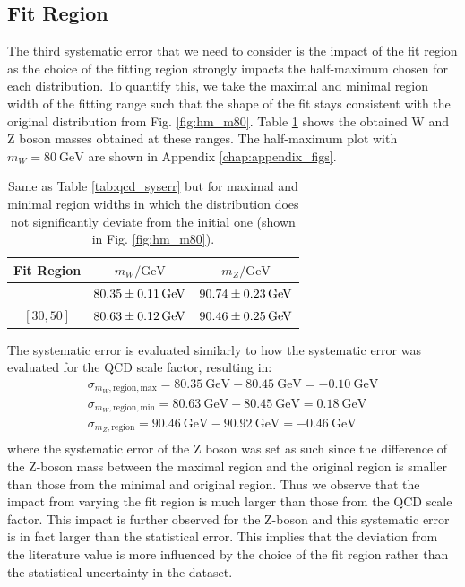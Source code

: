 \documentclass[a4paper]{report}
\numberwithin{equation}{section}
\begin{document}
\subsection{Fit Region}

The third systematic error that we need to consider is the impact of the fit region as the choice of the fitting region 
strongly impacts the half-maximum chosen for each distribution. To quantify this, we take the maximal and minimal 
region width of the fitting range such that the shape of the fit stays consistent with the original distribution from 
Fig. \ref{fig:hm_m80}. Table \ref{tab:fitregion_syserr} shows the obtained W and Z boson masses obtained at these ranges. 
The half-maximum plot with $m_W = \SI{80}{\giga\electronvolt}$ are shown in Appendix \ref{chap:appendix_figs}.

\begin{table}
    \centering
    \begin{tabular}{|c|c|c|} \hline
    Fit Region &  $m_W / \si{\giga\electronvolt}$ & $m_Z / \si{\giga\electronvolt}$\\ \hline
    [26, 65] & $\SI{80.35 \pm 0.11 }{\giga\electronvolt}$ & $\SI{90.74 \pm 0.23}{\giga\electronvolt}$ \\ 
    $\left[30, 50\right]$ & $\SI{80.63 \pm 0.12}{\giga\electronvolt}$ & $\SI{90.46 \pm 0.25}{\giga\electronvolt}$ \\ \hline
    \end{tabular}
    \caption{Same as Table \ref{tab:qcd_syserr} but for maximal and minimal region widths in which the distribution 
    does not significantly deviate from the initial one (shown in Fig. \ref{fig:hm_m80}).}
    \label{tab:fitregion_syserr}
\end{table}

The systematic error is evaluated similarly to how the systematic error was evaluated for the QCD scale factor, resulting in:
\begin{align}
    \sigma_{m_W, \mathrm{region, max}} = \SI{80.35}{\giga\electronvolt} - \SI{80.45}{\giga\electronvolt} = -\SI{0.10}{\giga\electronvolt} \\
    \sigma_{m_W, \mathrm{region, min}} = \SI{80.63}{\giga\electronvolt} - \SI{80.45}{\giga\electronvolt} = \SI{0.18}{\giga\electronvolt} \\
    \sigma_{m_Z, \mathrm{region}} = \SI{90.46}{\giga\electronvolt} - \SI{90.92}{\giga\electronvolt} = -\SI{0.46}{\giga\electronvolt} \\
\end{align}
where the systematic error of the Z boson was set as such since the difference of the Z-boson mass between the maximal
 region and the original region is smaller than those from the minimal and original region. Thus we observe that the impact from 
 varying the fit region is much larger than those from the QCD scale factor. This impact is further observed for the Z-boson and 
 this systematic error is in fact larger than the statistical error. This implies that the deviation from the literature value 
 is more influenced by the choice of the fit region rather than the statistical uncertainty in the dataset.
\end{document}
